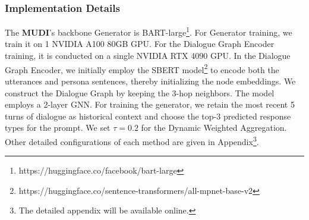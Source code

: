 \documentclass[letterpaper]{article} %
\begin{document}
\subsubsection{Implementation Details}
The \textbf{MUDI}'s backbone Generator is BART-large\footnote[1]{https://huggingface.co/facebook/bart-large}. For Generator training, we train it on 1 NVIDIA A100 80GB GPU. For the Dialogue Graph Encoder training, it is conducted on a single NVIDIA RTX 4090 GPU. In the Dialogue Graph Encoder, we initially employ the SBERT model\footnote[2]{https://huggingface.co/sentence-transformers/all-mpnet-base-v2} to encode both the utterances and persona sentences, thereby initializing the node embeddings. We construct the Dialogue Graph by keeping the 3-hop neighbors. The model employs a 2-layer GNN. For training the generator, we retain the most recent 5 turns of dialogue as historical context and choose the top-3 predicted response types for the prompt. We set \(\tau = 0.2\) for the Dynamic Weighted Aggregation. Other detailed configurations of each method are given in Appendix\footnote[3]{The detailed appendix will be available online.}.
\end{document}
